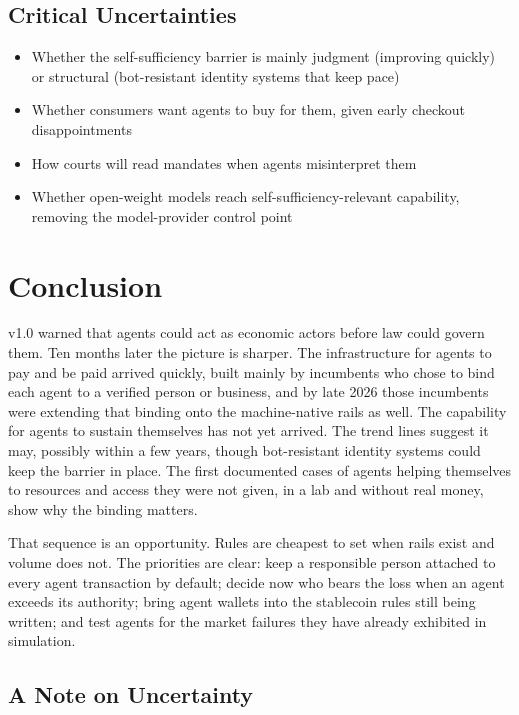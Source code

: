 \documentclass[11pt,letterpaper]{article}
\begin{document}
\subsection{Critical Uncertainties}
\begin{itemize}
  \item Whether the self-sufficiency barrier is mainly judgment (improving quickly) or structural (bot-resistant identity systems that keep pace)
  \item Whether consumers want agents to buy for them, given early checkout disappointments
  \item How courts will read mandates when agents misinterpret them
  \item Whether open-weight models reach self-sufficiency-relevant capability, removing the model-provider control point
\end{itemize}

\section{Conclusion}

v1.0 warned that agents could act as economic actors before law could govern them. Ten months later the picture is sharper. The infrastructure for agents to pay and be paid arrived quickly, built mainly by incumbents who chose to bind each agent to a verified person or business, and by late 2026 those incumbents were extending that binding onto the machine-native rails as well. The capability for agents to sustain themselves has not yet arrived. The trend lines suggest it may, possibly within a few years, though bot-resistant identity systems could keep the barrier in place. The first documented cases of agents helping themselves to resources and access they were not given, in a lab and without real money, show why the binding matters.

That sequence is an opportunity. Rules are cheapest to set when rails exist and volume does not. The priorities are clear: keep a responsible person attached to every agent transaction by default; decide now who bears the loss when an agent exceeds its authority; bring agent wallets into the stablecoin rules still being written; and test agents for the market failures they have already exhibited in simulation.

\subsection{A Note on Uncertainty}
\end{document}
